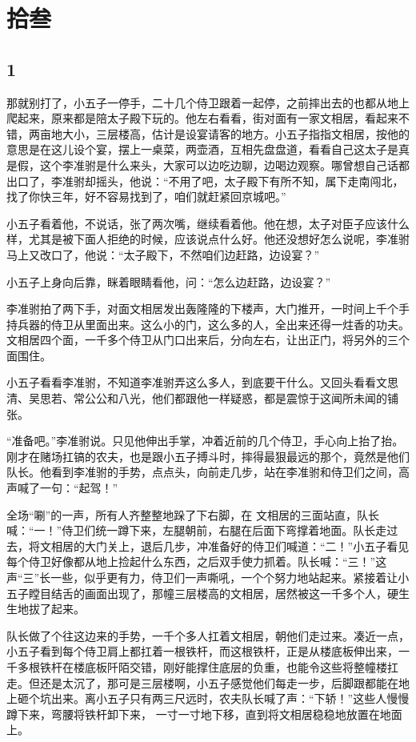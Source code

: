 \section{拾叁}

{\centering\subsection{1}}

那就别打了，小五子一停手，二十几个侍卫跟着一起停，之前摔出去的也都从地上爬起来，原来都是陪太子殿下玩的。他左右看看，街对面有一家文相居，看起来不错，两亩地大小，三层楼高，估计是设宴请客的地方。小五子指指文相居，按他的意思是在这儿设个宴，摆上一桌菜，两壶酒，互相先盘盘道，看看自己这太子是真是假，这个李准驸是什么来头，大家可以边吃边聊，边喝边观察。哪曾想自己话都出口了，李准驸却摇头，他说：“不用了吧，太子殿下有所不知，属下走南闯北，找了你快三年，好不容易找到了，咱们就赶紧回京城吧。”

小五子看着他，不说话，张了两次嘴，继续看着他。他在想，太子对臣子应该什么样，尤其是被下面人拒绝的时候，应该说点什么好。他还没想好怎么说呢，李准驸马上又改口了，他说：“太子殿下，不然咱们边赶路，边设宴？”

小五子上身向后靠，眯着眼睛看他，问：“怎么边赶路，边设宴？”

李准驸拍了两下手，对面文相居发出轰隆隆的下楼声，大门推开，一时间上千个手持兵器的侍卫从里面出来。这么小的门，这么多的人，全出来还得一炷香的功夫。文相居四个面，一千多个侍卫从门口出来后，分向左右，让出正门，将另外的三个面围住。

小五子看看李准驸，不知道李准驸弄这么多人，到底要干什么。又回头看看文思清、吴思若、常公公和八光，他们都跟他一样疑惑，都是震惊于这闻所未闻的铺张。

“准备吧。”李准驸说。只见他伸出手掌，冲着近前的几个侍卫，手心向上抬了抬。刚才在赌场扛镐的农夫，也是跟小五子搏斗时，摔得最狠最远的那个，竟然是他们队长。他看到李准驸的手势，点点头，向前走几步，站在李准驸和侍卫们之间，高声喊了一句：“起驾！”

全场“唰”的一声，所有人齐整整地跺了下右脚，在
文相居的三面站直，队长喊：“一！”侍卫们统一蹲下来，左腿朝前，右腿在后面下弯撑着地面。队长走过去，将文相居的大门关上，退后几步，冲准备好的侍卫们喊道：“二！”小五子看见每个侍卫好像都从地上捡起什么东西，之后双手使力抓着。队长喊：“三！”这声“三”长一些，似乎更有力，侍卫们一声嘶吼，一个个努力地站起来。紧接着让小五子瞠目结舌的画面出现了，那幢三层楼高的文相居，居然被这一千多个人，硬生生地拔了起来。

队长做了个往这边来的手势，一千个多人扛着文相居，朝他们走过来。凑近一点，小五子看到每个侍卫肩上都扛着一根铁杆，而这根铁杆，正是从楼底板伸出来，一千多根铁杆在楼底板阡陌交错，刚好能撑住底层的负重，也能令这些将整幢楼扛走。但还是太沉了，那可是三层楼啊，小五子感觉他们每走一步，后脚跟都能在地上砸个坑出来。离小五子只有两三尺远时，农夫队长喊了声：“下轿！”这些人慢慢蹲下来，弯腰将铁杆卸下来，
一寸一寸地下移，直到将文相居稳稳地放置在地面上。

